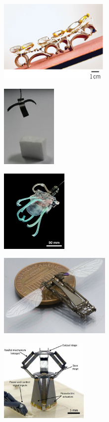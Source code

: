 \documentclass[border=1mm,
               class=article
               preview]{standalone}
\begin{document}
	\begin{subfigure}{.3\textwidth}
		\includegraphics[height=4cm,trim={0 1cm 0 0},clip]{images/chap0/sma-crawl-crop.jpg}
	\end{subfigure}
	\begin{subfigure}{.3\textwidth}
		\includegraphics[height=4cm,trim={0cm 0cm 0cm 0cm},clip]{images/chap0/bilayer-gripper-crop.jpg}
	\end{subfigure}
	\begin{subfigure}{.3\textwidth}
		\includegraphics[height=4cm,trim={0cm 0 0 0},clip]{images/chap0/jellyfish-gripper-crop.jpg}
	\end{subfigure}
	\begin{subfigure}{.3\textwidth}
		\includegraphics[height=4cm,trim={0cm 0 0 0},clip]{images/chap0/mobee-pzt-crop.jpg}
	\end{subfigure}
	\begin{subfigure}{.3\textwidth}
		\includegraphics[height=4cm,trim={0cm 0 0 0},clip]{images/chap0/pzt-delta-crop.jpg}
	\end{subfigure}
\end{document}
